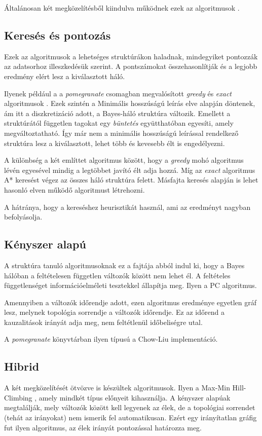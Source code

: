 Általánosan két megközelítésből kiindulva működnek ezek az algoritmusok \cite{tsamardinos2006max}.

\subsection{Keresés és pontozás}
Ezek az algoritmusok a lehetséges struktúrákon haladnak, mindegyiket pontozzák az adatsorhoz illeszkedésük szerint. A pontszámokat összehasonlítják és a legjobb eredmény elért lesz a kiválasztott háló.

Ilyenek például a a \emph{pomegranate} csomagban megvalósított \emph{greedy} és \emph{exact} algoritmusok \cite{schreiber2018pomegranate}. Ezek szintén a Minimális hosszúságú leírás elve alapján döntenek, ám itt a diszkretizáció adott, a Bayes-háló struktúra változik. Emellett a struktúrától független tagokat egy \emph{büntetés} együtthatóban egyesíti, amely megváltoztatható. Így már nem a minimális hosszúságú leírással rendelkező struktúra lesz a kiválasztott, lehet több és kevesebb élt is engedélyezni.

A különbség a két említtet algoritmus között, hogy a \emph{greedy} mohó algoritmus lévén egyesével mindig a legtöbbet javító élt adja hozzá. Míg az \emph{exact} algoritmus A* keresést végez az összes háló struktúra felett. Másfajta keresés alapján is lehet hasonló elven működő algoritmust létrehozni.

A hátránya, hogy a kereséshez heurisztikát használ, ami az eredményt nagyban befolyásolja.

\subsection{Kényszer alapú}
A struktúra tanuló algoritmusoknak ez a fajtája abból indul ki, hogy a Bayes hálóban a feltételesen független változók között nem lehet él. A feltételes függetlenséget információelméleti tesztekkel állapítja meg. Ilyen a PC \cite{spirtes2000constructing} algoritmus.

Amennyiben a változók időrendje adott, ezen algoritmus eredménye egyetlen gráf lesz, melynek topológia sorrendje a változók időrendje. Ez az időrend a kauzalitások irányát adja meg, nem feltétlenül időbeliségre utal.

A \emph{pomegranate} könyvtárban ilyen típusú a Chow-Liu implementáció.

\subsection{Hibrid}
A két megközelítését ötvözve is készültek algoritmusok. Ilyen a Max-Min Hill-Climbing \cite{tsamardinos2006max}, amely mindkét típus előnyeit kihasználja. A kényszer alapúak megtalálják, mely változók között kell legyenek az élek, de a topológiai sorrendet (tehát az irányokat) nem ismerik fel automatikusan. Ezért egy irányítatlan gráfig fut ilyen algoritmus, az élek irányát pontozással határozza meg.